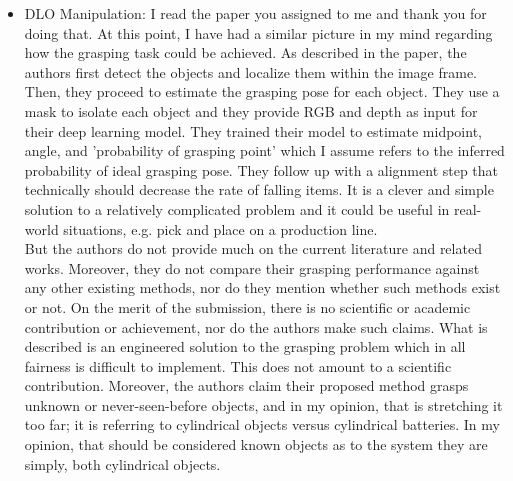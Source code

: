 \documentclass[11pt]{article}
\begin{document}
\begin{itemize}
    \item DLO Manipulation: I read the paper you assigned to me and thank you
    for doing that. At this point, I have had a similar picture in my mind
    regarding how the grasping task could be achieved. As described in the
    paper, the authors first detect the objects and localize them within the
    image frame. Then, they proceed to estimate the grasping pose for each object.
    They use a mask to isolate each object and they provide RGB and depth as
    input for their deep learning model. They trained their model to estimate
    midpoint, angle, and 'probability of grasping point' which I assume refers
    to the inferred probability of ideal grasping pose. They follow up with a
    alignment step that technically should decrease the rate of falling items.
    It is a clever and simple solution to a relatively complicated problem and
    it could be useful in real-world situations, e.g. pick and place on a
    production line. \\
    But the authors do not provide much on the current literature and related works.
    Moreover, they do not compare their grasping performance against any other
    existing methods, nor do they mention whether such methods exist or
    not. On the merit of the submission, there is no scientific or academic
    contribution or achievement, nor do the authors make such claims. What is
    described is an engineered solution to the grasping problem which in all
    fairness is difficult to implement. This does not amount to a scientific
    contribution. Moreover, the authors claim their proposed method grasps
    unknown or never-seen-before objects, and in my opinion, that is stretching it
    too far; it is referring to cylindrical objects versus cylindrical batteries.
    In my opinion, that should be considered known objects as to the system they
    are simply, both cylindrical objects.


\end{itemize}
\end{document}

